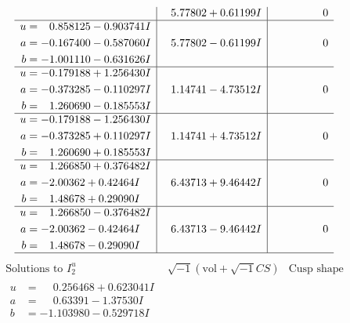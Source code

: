 \documentclass[1p]{elsarticle_modified}
\theoremstyle{definition}
\newcommand{\I}{\sqrt{-1}}
\begin{document}
$$\begin{array}{c|c|c}
 & \phantom{-}5.77802 + 0.61199 I & \phantom{-0.000000 } 0 \\ \hline\begin{aligned}
u &= \phantom{-}0.858125 - 0.903741 I \\
a &= -0.167400 - 0.587060 I \\
b &= -1.001110 - 0.631626 I\end{aligned}
 & \phantom{-}5.77802 - 0.61199 I & \phantom{-0.000000 } 0 \\ \hline\begin{aligned}
u &= -0.179188 + 1.256430 I \\
a &= -0.373285 - 0.110297 I \\
b &= \phantom{-}1.260690 - 0.185553 I\end{aligned}
 & \phantom{-}1.14741 - 4.73512 I & \phantom{-0.000000 } 0 \\ \hline\begin{aligned}
u &= -0.179188 - 1.256430 I \\
a &= -0.373285 + 0.110297 I \\
b &= \phantom{-}1.260690 + 0.185553 I\end{aligned}
 & \phantom{-}1.14741 + 4.73512 I & \phantom{-0.000000 } 0 \\ \hline\begin{aligned}
u &= \phantom{-}1.266850 + 0.376482 I \\
a &= -2.00362 + 0.42464 I \\
b &= \phantom{-}1.48678 + 0.29090 I\end{aligned}
 & \phantom{-}6.43713 + 9.46442 I & \phantom{-0.000000 } 0 \\ \hline\begin{aligned}
u &= \phantom{-}1.266850 - 0.376482 I \\
a &= -2.00362 - 0.42464 I \\
b &= \phantom{-}1.48678 - 0.29090 I\end{aligned}
 & \phantom{-}6.43713 - 9.46442 I & \phantom{-0.000000 } 0\\
 \hline 
 \end{array}$$\newpage$$\begin{array}{c|c|c}  
\text{Solutions to }I^u_{2}& \I (\text{vol} + \sqrt{-1}CS) & \text{Cusp shape}\\
 \hline 
\begin{aligned}
u &= \phantom{-}0.256468 + 0.623041 I \\
a &= \phantom{-}0.63391 - 1.37530 I \\
b &= -1.103980 - 0.529718 I\end{aligned}

\end{array}$$
\end{document}
